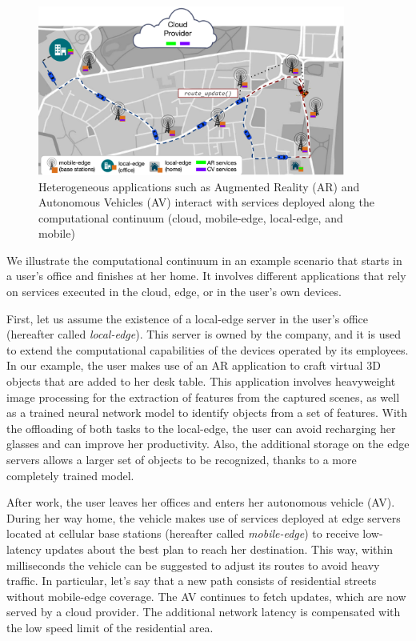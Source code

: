 \begin{figure}[tbp]
	\includegraphics[width=0.9\textwidth]{figs/Continuum-Scenario}
	\caption{Heterogeneous applications such as Augmented Reality (AR) and Autonomous Vehicles (AV) interact with services deployed along the computational continuum (cloud, mobile-edge, local-edge, and mobile)}
	\label{fig:continuum-scenario}
\end{figure}

We illustrate the computational continuum in an example scenario that starts in a user's office and finishes at her home. It involves different applications that rely on services executed in the cloud, edge, or in the user's own devices. 

First, let us assume the existence of a local-edge server in the user's office (hereafter called \textit{local-edge}). This server is owned by the company, and it is used to extend the computational capabilities of the devices operated by its employees. In our example, the user makes use of an AR application to craft virtual 3D objects that are added to her desk table. This application involves heavyweight image processing for the extraction of features from the captured scenes, as well as a trained neural network model to identify objects from a set of features. With the offloading of both tasks to the local-edge, the user can avoid recharging her glasses and can improve her productivity. Also, the additional storage on the edge servers allows a larger set of objects to be recognized, thanks to a more completely trained model.

After work, the user leaves her offices and enters her autonomous vehicle (AV). During her way home, the vehicle makes use of services deployed at edge servers located at cellular base stations (hereafter called \textit{mobile-edge}) to receive low-latency updates about the best plan to reach her destination. This way, within milliseconds the vehicle can be suggested to adjust its routes to avoid heavy traffic. In particular, let's say that a new path consists of residential streets without mobile-edge coverage. The AV continues to fetch updates, which are now served by a cloud provider. The additional network latency is compensated with the low speed limit of the residential area.


